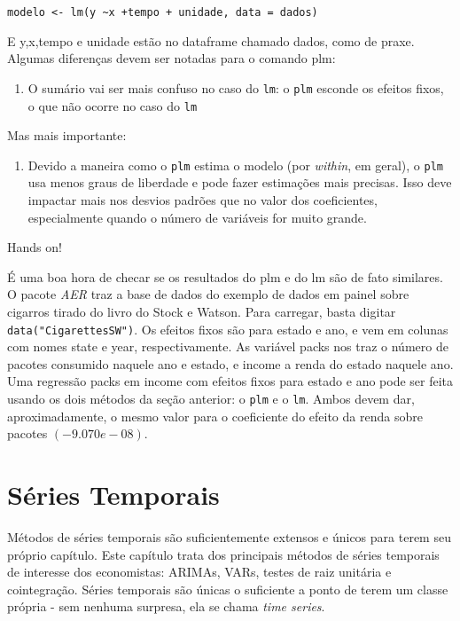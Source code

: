 \documentclass[]{book}
\providecommand{\tightlist}{%
  \setlength{\itemsep}{0pt}\setlength{\parskip}{0pt}}
\begin{document}
\begin{verbatim}
modelo <- lm(y ~x +tempo + unidade, data = dados)
\end{verbatim}

E y,x,tempo e unidade estão no dataframe chamado dados, como de praxe.
Algumas diferenças devem ser notadas para o comando plm:

\begin{enumerate}
\def\labelenumi{(\arabic{enumi})}
\tightlist
\item
  O sumário vai ser mais confuso no caso do \texttt{lm}: o \texttt{plm}
  esconde os efeitos fixos, o que não ocorre no caso do \texttt{lm}
\end{enumerate}

Mas mais importante:

\begin{enumerate}
\def\labelenumi{(\arabic{enumi})}
\setcounter{enumi}{1}
\tightlist
\item
  Devido a maneira como o \texttt{plm} estima o modelo (por
  \emph{within}, em geral), o \texttt{plm} usa menos graus de liberdade
  e pode fazer estimações mais precisas. Isso deve impactar mais nos
  desvios padrões que no valor dos coeficientes, especialmente quando o
  número de variáveis for muito grande.
\end{enumerate}

Hands on!

É uma boa hora de checar se os resultados do plm e do lm são de fato
similares. O pacote \emph{AER} traz a base de dados do exemplo de dados
em painel sobre cigarros tirado do livro do Stock e Watson. Para
carregar, basta digitar \texttt{data("CigarettesSW")}. Os efeitos fixos
são para estado e ano, e vem em colunas com nomes state e year,
respectivamente. As variável packs nos traz o número de pacotes
consumido naquele ano e estado, e income a renda do estado naquele ano.
Uma regressão packs em income com efeitos fixos para estado e ano pode
ser feita usando os dois métodos da seção anterior: o \texttt{plm} e o
\texttt{lm}. Ambos devem dar, aproximadamente, o mesmo valor para o
coeficiente do efeito da renda sobre pacotes \((-9.070e-08)\).

\chapter{Séries Temporais}\label{series-temporais}

Métodos de séries temporais são suficientemente extensos e únicos para
terem seu próprio capítulo. Este capítulo trata dos principais métodos
de séries temporais de interesse dos economistas: ARIMAs, VARs, testes
de raiz unitária e cointegração. Séries temporais são únicas o
suficiente a ponto de terem um classe própria - sem nenhuma surpresa,
ela se chama \emph{time series}.
\end{document}
